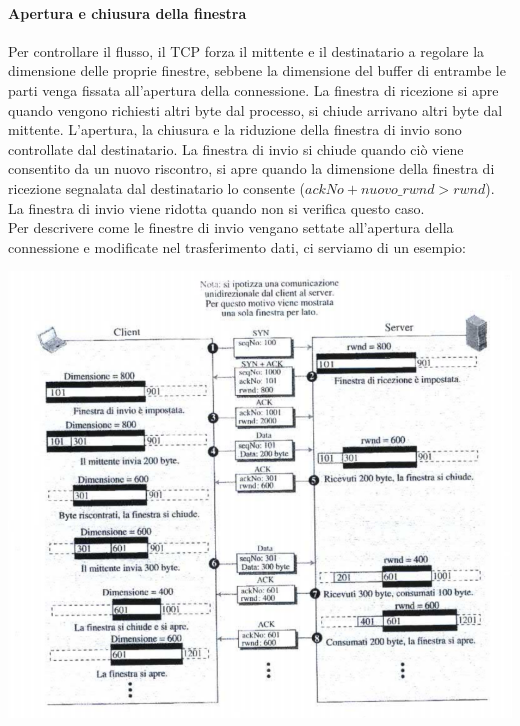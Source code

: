 \documentclass[12pt]{report}
\begin{document}
	\paragraph{Apertura e chiusura della finestra}
	Per controllare il flusso, il TCP forza il mittente e il destinatario a regolare la dimensione delle proprie finestre, sebbene la dimensione del buffer di entrambe le parti venga fissata all'apertura della connessione. La finestra di ricezione si apre quando vengono richiesti altri byte dal processo, si chiude arrivano altri byte dal mittente. L'apertura, la chiusura e la riduzione della finestra di invio sono controllate dal destinatario. La finestra di invio si chiude quando ciò viene consentito da un nuovo riscontro, si apre quando la dimensione della finestra di ricezione segnalata dal destinatario lo consente ($ackNo + nuovo\_rwnd > rwnd$). La finestra di invio viene ridotta quando non si verifica questo caso.
	\vspace{\baselineskip}\\
	Per descrivere come le finestre di invio vengano settate all'apertura della connessione e modificate nel trasferimento dati, ci serviamo di un esempio:
	\begin{center}
		\includegraphics[scale=0.6]{assets/flowcontrol2.png}
	\end{center}
\end{document}
